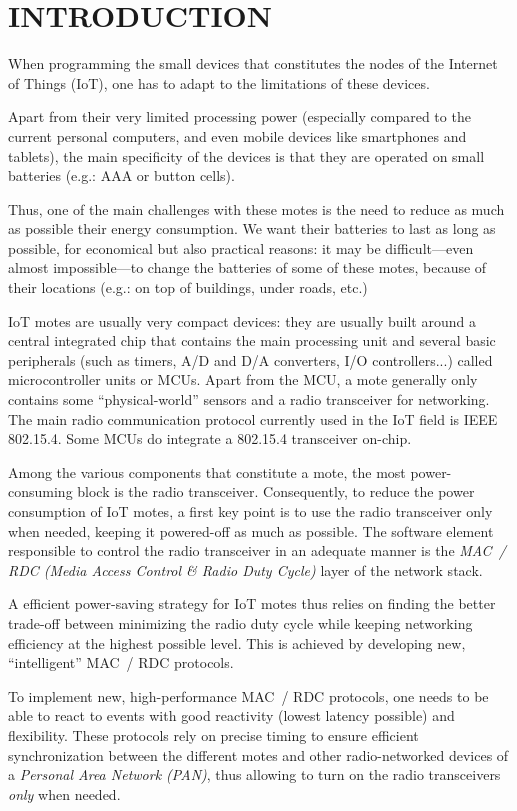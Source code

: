\documentclass[a4paper,twoside]{article}
\begin{document}
\section{\uppercase{Introduction}}

When programming the small devices that constitutes the nodes of
the Internet of Things (IoT), one has to adapt to the limitations of
these devices.

Apart from their very limited processing power (especially compared to
the current personal computers, and even mobile devices like smartphones
and tablets), the main specificity of the devices is that they are operated
on small batteries (e.g.: AAA or button cells).

Thus, one of the main challenges with these motes is the need to reduce
as much as possible their energy consumption. We want their batteries to last
as long as possible, for economical but also practical reasons: it may be
difficult---even almost impossible---to change the batteries of some of these
motes, because of their locations (e.g.: on top of buildings, under roads,
etc.)

IoT motes are usually very compact devices: they are usually built around
a central integrated chip that contains the main processing unit and several
basic peripherals (such as timers, A/D and D/A converters, I/O controllers...)
called microcontroller units or MCUs. Apart from the MCU, a mote generally
only contains some ``physical-world'' sensors and a radio transceiver for
networking. The main radio communication protocol currently used in the IoT
field is IEEE 802.15.4. Some MCUs do integrate a 802.15.4 transceiver on-chip.

Among the various components that constitute a mote, the most power-consuming
block is the radio transceiver. Consequently, to reduce the power consumption
of IoT motes, a first key point is to use the radio transceiver only when
needed, keeping it powered-off as much as possible. The software element
responsible to control the radio transceiver in an adequate manner is
the \emph{MAC~/ RDC (Media Access Control \& Radio Duty Cycle)}
layer of the network stack.

A efficient power-saving strategy for IoT motes thus relies on finding the
better trade-off between minimizing the radio duty cycle while keeping
networking efficiency at the highest possible level. This is achieved
by developing new, ``intelligent'' MAC~/ RDC protocols.

To implement new, high-performance MAC~/ RDC protocols, one needs to be
able to react to events with good reactivity (lowest latency possible) and
flexibility. These protocols rely on precise timing to ensure efficient
synchronization between the different motes and other radio-networked
devices of a \emph{Personal Area Network (PAN)}, thus allowing
to turn on the radio transceivers \emph{only} when needed.
\end{document}
